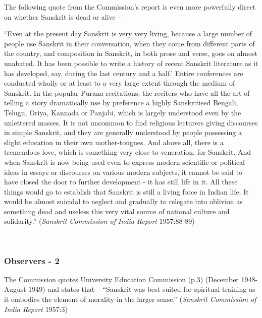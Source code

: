 The following quote from the Commission’s report is even more powerfully direct on whether Sanskrit is dead or alive  – 
\newpage

\begin{myquote}
\eleven
“Even at the present day Sanskrit is very very living, because a large number of people use Sanskrit in their conversation, when they come from different parts of the country, and composition in Sanskrit, in both prose and verse, goes on almost unabated. It has been possible to write a history of recent Sanskrit literature as it has developed, say, during the last century and a half.' Entire conferences are conducted wholly or at least to a very large extent through the medium of Sanskrit. In the popular Purana recitations, the reciters who have all the art of telling a story dramatically use by preference a highly Sanskritised Bengali, Telugu, Oriya, Kannada or Panjabi, which is largely understood even by the unlettered masses. It is not uncommon to find religious lecturers giving discourses in simple Sanskrit, and they are generally understood by people possessing a slight education in their own mother-tongues. And above all, there is a tremendous love, which is something very close to veneration, for Sanskrit. And when Sanskrit is now being used even to express modern scientific or political ideas in essays or discourses on various modern subjects, it cannot be said to have closed the door to further development - it has still life in it. All these things would go to establish that Sanskrit is still a living force in Indian life. It would be almost suicidal to neglect and gradually to relegate into oblivion as something dead and useless this very vital source of national culture and solidarity.” \hfill({\sl Sanskrit Commission of India Report} 1957:88-89)
\end{myquote}

~\\[-30pt]
 
\subsubsection{Observers - 2}
\vskip -5pt
The Commission quotes University Education Commission (p.3) (December 1948- August 1949) and states that – “Sanskrit was best suited for spiritual training as it embodies the element of morality in the larger sense.” ({\sl Sanskrit Commission of India Report} 1957:3)

